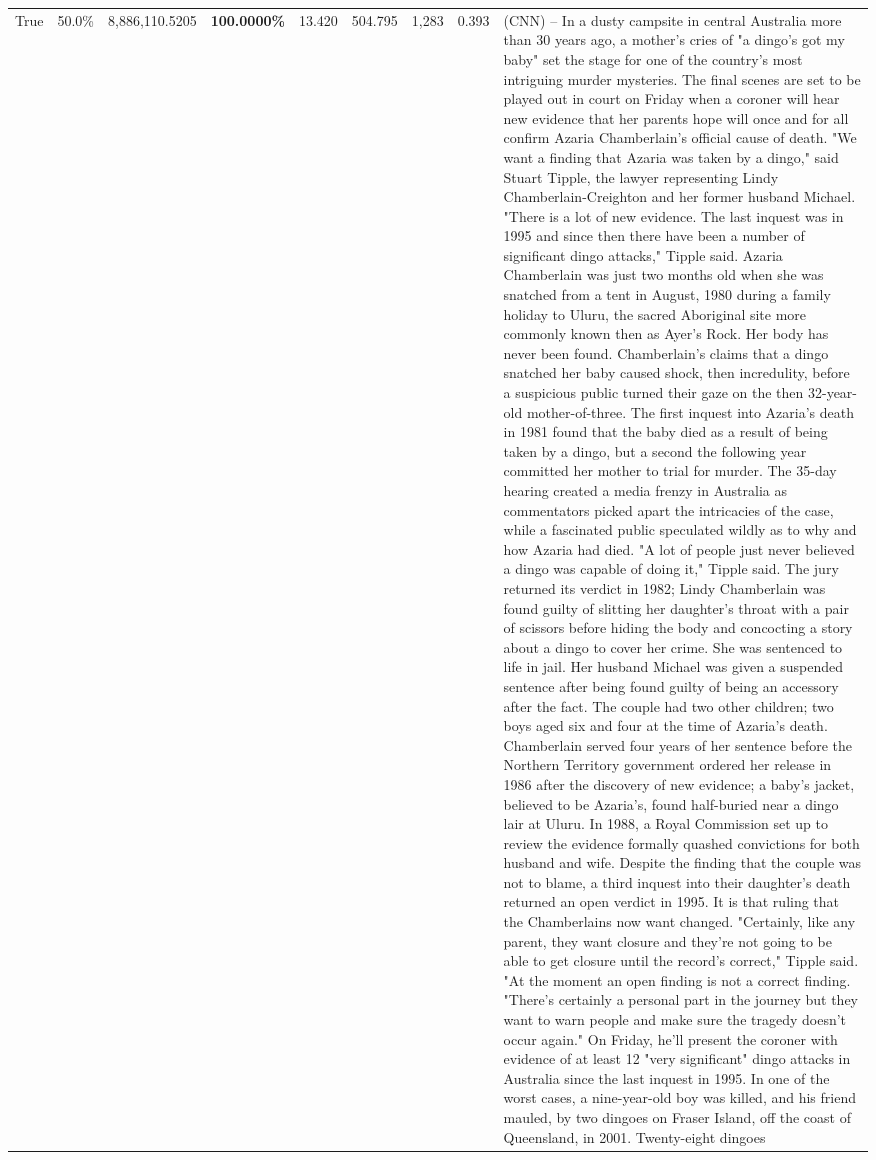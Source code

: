 \begin{table}[H]
\begin{tabular}{lllrlllll}
True & 50.0\% & 8,886,110.5205 & \bfseries \color{red} 100.0000\% & 13.420 & 504.795 & 1,283 & 0.393 & (CNN) -- In a dusty campsite in central Australia more than 30 years ago, a mother's cries of "a dingo's got my baby" set the stage for one of the country's most intriguing murder mysteries. The final scenes are set to be played out in court on Friday when a coroner will hear new evidence that her parents hope will once and for all confirm Azaria Chamberlain's official cause of death. "We want a finding that Azaria was taken by a dingo," said Stuart Tipple, the lawyer representing Lindy Chamberlain-Creighton and her former husband Michael. "There is a lot of new evidence. The last inquest was in 1995 and since then there have been a number of significant dingo attacks," Tipple said. Azaria Chamberlain was just two months old when she was snatched from a tent in August, 1980 during a family holiday to Uluru, the sacred Aboriginal site more commonly known then as Ayer's Rock. Her body has never been found. Chamberlain's claims that a dingo snatched her baby caused shock, then incredulity, before a suspicious public turned their gaze on the then 32-year-old mother-of-three. The first inquest into Azaria's death in 1981 found that the baby died as a result of being taken by a dingo, but a second the following year committed her mother to trial for murder. The 35-day hearing created a media frenzy in Australia as commentators picked apart the intricacies of the case, while a fascinated public speculated wildly as to why and how Azaria had died. "A lot of people just never believed a dingo was capable of doing it," Tipple said. The jury returned its verdict in 1982; Lindy Chamberlain was found guilty of slitting her daughter's throat with a pair of scissors before hiding the body and concocting a story about a dingo to cover her crime. She was sentenced to life in jail. Her husband Michael was given a suspended sentence after being found guilty of being an accessory after the fact. The couple had two other children; two boys aged six and four at the time of Azaria's death. Chamberlain served four years of her sentence before the Northern Territory government ordered her release in 1986 after the discovery of new evidence; a baby's jacket, believed to be Azaria's, found half-buried near a dingo lair at Uluru. In 1988, a Royal Commission set up to review the evidence formally quashed convictions for both husband and wife. Despite the finding that the couple was not to blame, a third inquest into their daughter's death returned an open verdict in 1995. It is that ruling that the Chamberlains now want changed. "Certainly, like any parent, they want closure and they're not going to be able to get closure until the record's correct," Tipple said. "At the moment an open finding is not a correct finding. "There's certainly a personal part in the journey but they want to warn people and make sure the tragedy doesn't occur again." On Friday, he'll present the coroner with evidence of at least 12 "very significant" dingo attacks in Australia since the last inquest in 1995. In one of the worst cases, a nine-year-old boy was killed, and his friend mauled, by two dingoes on Fraser Island, off the coast of Queensland, in 2001. Twenty-eight dingoes 
\end{tabular}
\end{table}

